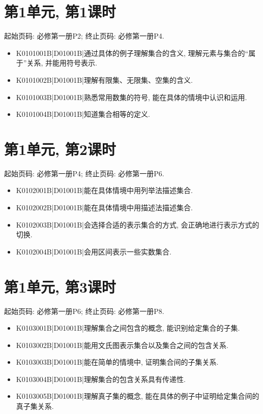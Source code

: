 \section*{第1单元, 第1课时}
起始页码: 必修第一册P2; 终止页码: 必修第一册P4.
\begin{itemize}
\item K0101001B|D01001B|通过具体的例子理解集合的含义, 理解元素与集合的``属于''关系, 并能用符号表示.
\item K0101002B|D01001B|理解有限集、无限集、空集的含义.
\item K0101003B|D01001B|熟悉常用数集的符号, 能在具体的情境中认识和运用.
\item K0101004B|D01001B|知道集合相等的定义.
\end{itemize}

\section*{第1单元, 第2课时}
起始页码: 必修第一册P4; 终止页码: 必修第一册P6.
\begin{itemize}
\item K0102001B|D01001B|能在具体情境中用列举法描述集合.
\item K0102002B|D01001B|能在具体情境中用描述法描述集合.
\item K0102003B|D01001B|会选择合适的表示集合的方式, 会正确地进行表示方式的切换.
\item K0102004B|D01001B|会用区间表示一些实数集合.
\end{itemize}

\section*{第1单元, 第3课时}
起始页码: 必修第一册P6; 终止页码: 必修第一册P8.
\begin{itemize}
\item K0103001B|D01001B|理解集合之间包含的概念, 能识别给定集合的子集.
\item K0103002B|D01001B|能用文氏图表示集合以及集合之间的包含关系.
\item K0103003B|D01001B|能在简单的情境中, 证明集合间的子集关系.
\item K0103004B|D01001B|理解集合的包含关系具有传递性.
\item K0103005B|D01001B|理解真子集的概念, 能在具体的例子中证明给定集合间的真子集关系.
\end{itemize}

